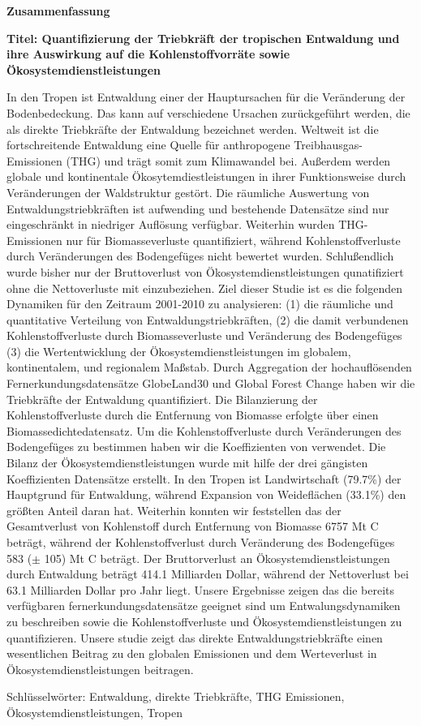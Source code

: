 \thispagestyle{empty}

\begin{de}
	\begin{center}
		\textbf{Zusammenfassung}
	\end{center}
	\textbf{Titel: Quantifizierung der Triebkräft der tropischen Entwaldung und ihre Auswirkung auf die Kohlenstoffvorräte sowie Ökosystemdienstleistungen}

	In den Tropen ist Entwaldung einer der Hauptursachen für die Veränderung der Bodenbedeckung. Das kann auf verschiedene Ursachen zurückgeführt werden, die als direkte Triebkräfte der Entwaldung bezeichnet werden. Weltweit ist die fortschreitende Entwaldung eine Quelle für anthropogene Treibhausgas-Emissionen (THG) und trägt somit zum Klimawandel bei. Außerdem werden globale und kontinentale Ökosytemdiestleistungen in ihrer Funktionsweise durch Veränderungen der Waldstruktur gestört. Die räumliche Auswertung von Entwaldungstriebkräften ist aufwending und bestehende Datensätze sind nur eingeschränkt in niedriger Auflösung verfügbar. Weiterhin wurden THG-Emissionen nur für Biomasseverluste quantifiziert, während Kohlenstoffverluste durch Veränderungen des Bodengefüges nicht bewertet wurden. Schlußendlich wurde bisher nur der Bruttoverlust von Ökosystemdienstleistungen qunatifiziert ohne die Nettoverluste mit einzubeziehen. Ziel dieser Studie ist es die folgenden Dynamiken für den Zeitraum 2001-2010 zu analysieren: (1) die räumliche und quantitative Verteilung von Entwaldungstriebkräften, (2) die damit verbundenen Kohlenstoffverluste durch Biomasseverluste und Veränderung des Bodengefüges (3) die Wertentwicklung der Ökosystemdienstleistungen im globalem, kontinentalem, und regionalem Maßstab. Durch Aggregation der hochauflösenden Fernerkundungsdatensätze GlobeLand30 und Global Forest Change haben wir die Triebkräfte der Entwaldung quantifiziert. Die Bilanzierung der Kohlenstoffverluste durch die Entfernung von Biomasse erfolgte über einen Biomassedichtedatensatz. Um die Kohlenstoffverluste durch Veränderungen des Bodengefüges zu bestimmen haben wir die Koeffizienten von \citet{Don2010} verwendet. Die Bilanz der Ökosystemdienstleistungen wurde mit hilfe der drei gängisten Koeffizienten Datensätze erstellt. In den Tropen ist Landwirtschaft (79.7\%) der Hauptgrund für Entwaldung, während Expansion von Weideflächen (33.1\%) den größten Anteil daran hat. Weiterhin konnten wir feststellen das der Gesamtverlust von Kohlenstoff durch Entfernung von Biomasse 6757 Mt C beträgt, während der Kohlenstoffverlust durch Veränderung des Bodengefüges 583 ($\pm$ 105) Mt C beträgt. Der Bruttorverlust an Ökosystemdienstleistungen durch Entwaldung beträgt 414.1 Milliarden Dollar, während der Nettoverlust bei 63.1 Milliarden Dollar pro Jahr liegt. Unsere Ergebnisse zeigen das die bereits verfügbaren fernerkundungsdatensätze geeignet sind um Entwalungsdynamiken zu beschreiben sowie die Kohlenstoffverluste und Ökosystemdienstleistungen zu quantifizieren. Unsere studie zeigt das direkte Entwaldungstriebkräfte einen wesentlichen Beitrag zu den globalen Emissionen und dem Werteverlust in Ökosystemdienstleistungen beitragen.

	Schlüsselwörter: Entwaldung, direkte Triebkräfte, THG Emissionen, Ökosystemdienstleistungen, Tropen
\end{de}